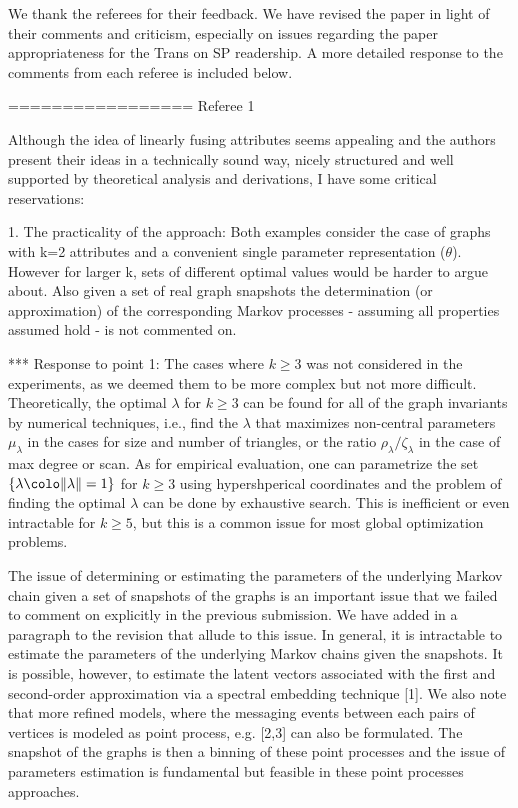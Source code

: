 We thank the referees for their feedback. We have
revised the paper in light of their comments and criticism, especially 
on issues regarding the paper appropriateness for the Trans on SP
readership. A more detailed response to the comments from each referee
is included below. 

=================
Referee 1

Although the idea of linearly fusing attributes seems appealing and
the authors present their ideas in a technically sound way, nicely
structured and well supported by theoretical analysis and derivations,
I have some critical reservations:

1. The practicality of the approach: Both examples consider the case
of graphs with k=2 attributes and a convenient single parameter
representation ($\theta$). However for larger k, sets of different
optimal values would be harder to argue about. Also given a set of
real graph snapshots the determination (or approximation) of the
corresponding Markov processes - assuming all properties assumed hold
- is not commented on.

*** Response to point 1:
    The cases where $ k \geq 3$ was not considered in the experiments,
    as we deemed them to be more complex but not more
    difficult. Theoretically, the optimal $\lambda$ for $k \geq 3$ can
    be found for all of the graph invariants by numerical techniques,
    i.e., find the $\lambda$ that maximizes non-central parameters
    $\mu_{\lambda}$ in the cases for size and number of triangles, or
    the ratio $\rho_{\lambda}/\zeta_{\lambda}$ in the case of max
    degree or scan. As for empirical evaluation, one can parametrize 
    the set $\{\lambda \colo \| \lambda \| = 1\}$ for $k \geq 3$
    using hypershperical coordinates and the problem of finding the
    optimal $\lambda$ can be done by exhaustive search. This is 
    inefficient or even intractable for $k \geq 5$, but this is a
    common issue for most global optimization problems. 
    
    The issue of determining or estimating the parameters of the
    underlying Markov chain given a set of snapshots of the graphs is an
    important issue that we failed to comment on explicitly in the
    previous submission. We have added in a paragraph to the revision that
    allude to this issue. In general, it is intractable to estimate the
    parameters of the underlying Markov chains given the snapshots. It is
    possible, however, to estimate the latent vectors associated with the
    first and second-order approximation via a spectral embedding
    technique [1]. We also note that more refined models, where the
    messaging events between each pairs of vertices is modeled as point
    process, e.g. [2,3] can also be formulated. The snapshot of the graphs
    is then a binning of these point processes and the issue of parameters
    estimation is fundamental but feasible in these point processes
    approaches.

